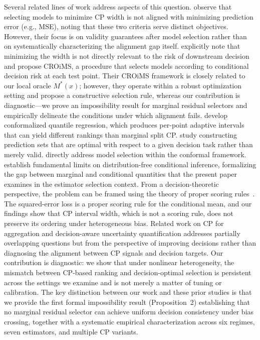 \documentclass[pdflatex,sn-mathphys-ay]{sn-jnl}%
\theoremstyle{thmstyleone}%
\theoremstyle{thmstyletwo}%
\theoremstyle{thmstylethree}%
\begin{document}
Several related lines of work address aspects of this question. \citet{liang2024conformal} observe that selecting models to minimize CP width is not aligned with minimizing prediction error (e.g., MSE), noting that these two criteria serve distinct objectives. However, their focus is on validity guarantees after model selection rather than on systematically characterizing the alignment gap itself. \citet{bao2025optimal} explicitly note that minimizing the width is not directly relevant to the risk of downstream decision and propose CROiMS, a procedure that selects models according to conditional decision risk at each test point. Their CROiMS framework is closely related to our local oracle $M^*(x)$; however, they operate within a robust optimization setting and propose a constructive selection rule, whereas our contribution is diagnostic---we prove an impossibility result for marginal residual selectors and empirically delineate the conditions under which alignment fails. \citet{romano2019conformalized} develop conformalized quantile regression, which produces per-point adaptive intervals that can yield different rankings than marginal split CP. \citet{rosenfeld2022riskoptimal} study constructing prediction sets that are optimal with respect to a given decision task rather than merely valid. \citet{jin2023model} directly address model selection within the conformal framework. \citet{barber2021limits} establish fundamental limits on distribution-free conditional inference, formalizing the gap between marginal and conditional quantities that the present paper examines in the estimator selection context. From a decision-theoretic perspective, the problem can be framed using the theory of proper scoring rules~\citep{gneiting2007strictly}. The squared-error loss is a proper scoring rule for the conditional mean, and our findings show that CP interval width, which is not a scoring rule, does not preserve its ordering under heterogeneous bias. Related work on CP for aggregation and decision-aware uncertainty quantification addresses partially overlapping questions but from the perspective of improving decisions rather than diagnosing the alignment between CP signals and decision targets. Our contribution is diagnostic: we show that under nonlinear heterogeneity, the mismatch between CP-based ranking and decision-optimal selection is persistent across the settings we examine and is not merely a matter of tuning or calibration. The key distinction between our work and these prior studies is that we provide the first formal impossibility result (Proposition~2) establishing that no marginal residual selector can achieve uniform decision consistency under bias crossing, together with a systematic empirical characterization across six regimes, seven estimators, and multiple CP variants.
\end{document}
